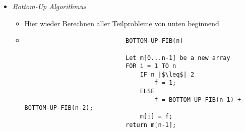 \begin{itemize}
\begin{itemize}
\begin{itemize}
\begin{verbatim}
                            IF m[n-1] != 0
                                return m[n-1];      // Auslesen von gespeicherten Werten
                            IF n |$\leq$| 2
                                f = 1;
                            ELSE
                                f = MEMOIZED-FIB-AUX(n-1, m) + MEMOIZED-FIB-AUX(n-2, m);
                            m[n-1] = f;
                            return f;
                            \end{verbatim}
                    \end{itemize}
                \item \textit{Bottom-Up Algorithmus}
                    \begin{itemize}
                        \item Hier wieder Berechnen aller Teilprobleme von unten beginnend
                        \item[]
                            \begin{verbatim}
                            BOTTOM-UP-FIB(n)

                            Let m[0...n-1] be a new array
                            FOR i = 1 TO n
                                IF n |$\leq$| 2
                                    f = 1;
                                ELSE
                                    f = BOTTOM-UP-FIB(n-1) + BOTTOM-UP-FIB(n-2);
                                m[i] = f;
                            return m[n-1];
                            \end{verbatim}
                    \end{itemize}
            \end{itemize}
    \end{itemize}

